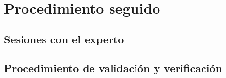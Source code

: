 
\chapter{Procedimiento seguido}

\section{Sesiones con el experto}
\section{Procedimiento de validación y verificación}
